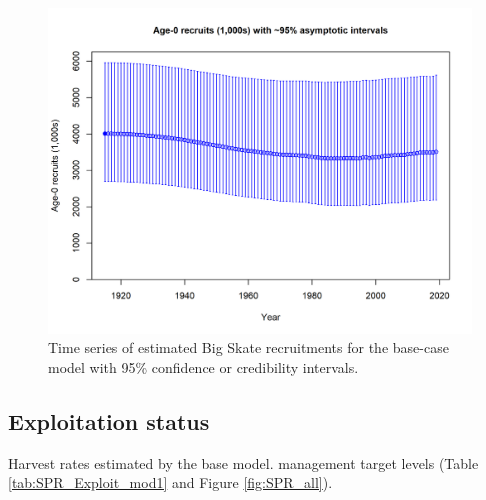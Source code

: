 \documentclass[12pt,]{article}
\begin{document}
\FloatBarrier

\begin{figure}
\centering
\includegraphics{r4ss/plots_mod1/ts11_Age-0_recruits_(1000s)_with_95_asymptotic_intervals.png}
\caption{Time series of estimated Big Skate recruitments for the
base-case model with 95\% confidence or credibility intervals.
\label{fig:Recruits_all}}
\end{figure}

\FloatBarrier

\hypertarget{exploitation-status}{%
\subsection*{Exploitation status}\label{exploitation-status}}

Harvest rates estimated by the base model. management target levels
(Table \ref{tab:SPR_Exploit_mod1} and Figure \ref{fig:SPR_all}).

\FloatBarrier
\end{document}
